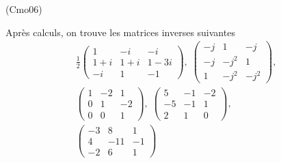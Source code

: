 \begin{tiny}(Cmo06)\end{tiny} Après calculs, on trouve les matrices inverses suivantes
\begin{multline*}
\frac{1}{2} 
\begin{pmatrix}
1 & -i & -i \\ 1+i & 1+i & 1-3i \\-i & 1 & -1  
\end{pmatrix},\;
\begin{pmatrix}
 -j & 1 & -j \\ -j & -j^2 & 1 \\ 1 & -j^2 & -j^2
\end{pmatrix},\;\\
\begin{pmatrix}
1 &-2 & 1 \\0 & 1 & -2\\ 0 & 0 &1  
\end{pmatrix},\;
\begin{pmatrix}
5 & -1 & -2\\ -5 & -1 & 1\\ 2 & 1 & 0
\end{pmatrix},\;\\
\begin{pmatrix}
 -3 & 8 & 1\\ 4 & -11 &-1 \\-2 & 6 & 1
\end{pmatrix}
\end{multline*}

